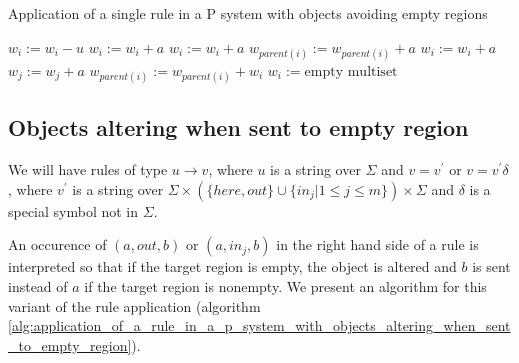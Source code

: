 \begin{algorithm}
  \caption{Application of a single rule in a P system with objects avoiding empty regions}\label{alg:application_of_a_rule_in_a_p_system_with_objects_avoiding_empty_regions}
  \begin{algorithmic}[1]
      \State $w_i := w_i - u$
        \State $w_i := w_i + a$
      \EndFor
          \State $w_i := w_i + a$
        \Else
          \State $w_{parent(i)} := w_{parent(i)} + a$
        \EndIf
      \EndFor
          \State $w_i := w_i + a$
        \Else
          \State $w_j := w_j + a$
        \EndIf
      \EndFor
        \State $w_{parent(i)} := w_{parent(i)} + w_i$
        \State $w_i := \text{empty multiset}$
      \EndIf
    \EndProcedure
  \end{algorithmic}
\end{algorithm}


\subsection{Objects altering when sent to empty region} %
\label{sub:objects_altering_when_sent_to_empty_region}

We will have rules of type $u\rightarrow v$, where $u$ is a string over $\Sigma$ and $v=v^\prime$ or $v=v^\prime\delta$, where $v^\prime$ is a string over $\Sigma\times(\{here, out\}\cup\{in_j|1\leq j\leq m\})\times\Sigma$ and $\delta$ is a special symbol not in $\Sigma$.

An occurence of $(a, out, b)$ or $(a, in_j, b)$ in the right hand side of a rule is interpreted so that if the target region is empty, the object is altered and $b$ is sent instead of $a$ if the target region is nonempty. We present an algorithm for this variant of the rule application  (algorithm \ref{alg:application_of_a_rule_in_a_p_system_with_objects_altering_when_sent_to_empty_region}).


